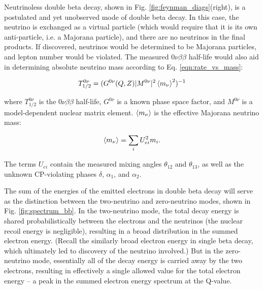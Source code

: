 
Neutrinoless double beta decay, shown in Fig. \ref{fig:feynman_diags}(right), is a postulated and yet unobserved mode of double beta decay. In this case, the neutrino is exchanged as a virtual particle (which would require that it is its own anti-particle, i.e. a Majorana particle), and there are no neutrinos in the final products. If discovered, neutrinos would be determined to be Majorana particles, and lepton number would be violated.  The measured $0\nu\beta\beta$ half-life would also aid in determining absolute neutrino mass according to Eq. \ref{eqn:rate_vs_mass}:

\begin{equation}
T_{1/2}^{0\nu} = (G^{0\nu}(Q,Z)|M^{0\nu}|^{2}\braket{m_{\nu}}^{2})^{-1}
\label{eqn:rate_vs_mass}
\end{equation}

\noindent
where $T_{1/2}^{0\nu}$ is the $0\nu\beta\beta$ half-life,  $G^{0\nu}$ is a known phase space factor, and $M^{0\nu}$ is a model-dependent nuclear matrix element.  $\braket{m_{\nu}}$ is the effective Majorana neutrino mass:

\begin{equation}
\braket{m_{\nu}} = \sum\limits_{i} U_{ei}^{2} m_{i}.
\label{eqn:effectivemass}
\end{equation}

\noindent
The terms $U_{ei}$ contain the measured mixing angles $\theta_{12}$ and $\theta_{13}$, as well as the unknown CP-violating phases $\delta$, $\alpha_1$, and $\alpha_2$.

The sum of the energies of the emitted electrons in double beta decay will serve as the distinction between the two-neutrino and zero-neutrino modes, shown in Fig. \ref{fig:spectrum_bb}. In the two-neutrino mode, the total decay energy is shared probabilistically between the electrons and the neutrinos (the nuclear recoil energy is negligible), resulting in a broad distribution in the summed electron energy. (Recall the similarly broad electron energy in single beta decay, which ultimately led to discovery of the neutrino involved.) But in the zero-neutrino mode, essentially all of the decay energy is carried away by the two electrons, resulting in effectively a single allowed value for the total electron energy -- a peak in the summed electron energy spectrum at the Q-value. 

